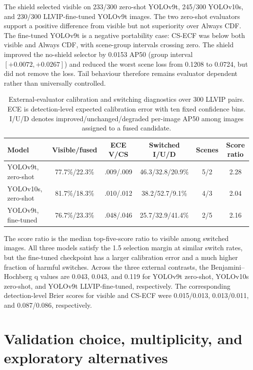 \documentclass[11pt]{article}
\begin{document}
The shield selected visible on 233/300 zero-shot YOLOv9t, 245/300 YOLOv10s,
and 230/300 LLVIP-fine-tuned YOLOv9t images. The two zero-shot evaluators support
a positive difference from visible but not superiority over Always CDF. The
fine-tuned YOLOv9t is a negative portability case: CS-ECF was below both
visible and Always CDF, with scene-group intervals crossing zero. The shield
improved the no-shield selector by 0.0153 AP50 (group interval
\([+0.0072,+0.0267]\)) and reduced the worst scene loss from 0.1208 to 0.0724,
but did not remove the loss. Tail behaviour therefore remains evaluator
dependent rather than universally controlled.

\begin{table}[ht]
\centering
\scriptsize
\setlength{\tabcolsep}{3pt}
\caption{External-evaluator calibration and switching diagnostics over 300
LLVIP pairs. ECE is detection-level expected calibration error with ten fixed
confidence bins. I/U/D denotes improved/unchanged/degraded per-image AP50 among
images assigned to a fused candidate.}
\begin{tabular}{@{}lccccc@{}}
\toprule
Model & Visible/fused & ECE V/CS & Switched I/U/D & Scenes & Score ratio \\
\midrule
YOLOv9t, zero-shot & 77.7\%/22.3\% & .009/.009 &
46.3/32.8/20.9\% & 5/2 & 2.28 \\
YOLOv10s, zero-shot & 81.7\%/18.3\% & .010/.012 &
38.2/52.7/9.1\% & 4/3 & 2.04 \\
YOLOv9t, fine-tuned & 76.7\%/23.3\% & .048/.046 &
25.7/32.9/41.4\% & 2/5 & 2.16 \\
\bottomrule
\end{tabular}
\end{table}

The score ratio is the median top-five-score ratio to visible among switched
images. All three models satisfy the 1.5 selection margin at similar switch
rates, but the fine-tuned checkpoint has a larger calibration error and a much
higher fraction of harmful switches. Across the three external contrasts, the
Benjamini--Hochberg q values are 0.043, 0.043, and 0.119 for YOLOv9t
zero-shot, YOLOv10s zero-shot, and YOLOv9t LLVIP-fine-tuned, respectively.
The corresponding detection-level Brier scores for visible and CS-ECF were
0.015/0.013, 0.013/0.011, and 0.087/0.086, respectively.

\small
\section{Validation choice, multiplicity, and exploratory alternatives}
\end{document}
